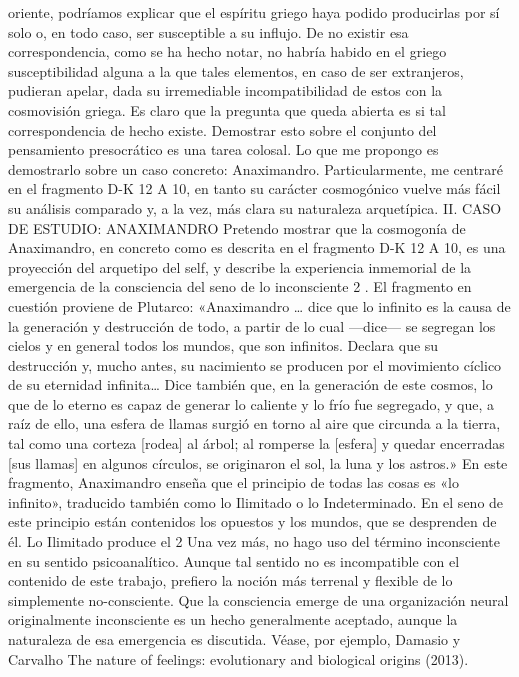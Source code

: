 \documentclass[a4paper]{article}
\begin{document}
oriente, podríamos explicar que el espíritu griego haya podido producirlas por
sí solo o, en todo caso, ser susceptible a su influjo. De no existir esa
correspondencia, como se ha hecho notar, no habría habido en el griego
susceptibilidad alguna a la que tales elementos, en caso de ser extranjeros,
pudieran apelar, dada su irremediable incompatibilidad de estos con la
cosmovisión griega. Es claro que la pregunta que queda abierta es si tal
correspondencia de hecho existe. Demostrar esto sobre el conjunto del
pensamiento presocrático es una tarea colosal. Lo que me propongo es demostrarlo
sobre un caso concreto: Anaximandro. Particularmente, me centraré en el
fragmento D-K 12 A 10, en tanto su carácter cosmogónico vuelve más fácil su
análisis comparado y, a la vez, más clara su naturaleza arquetípica. II. CASO DE
ESTUDIO: ANAXIMANDRO Pretendo mostrar que la cosmogonía de Anaximandro, en
concreto como es descrita en el fragmento D-K 12 A 10, es una proyección del
arquetipo del self, y describe la experiencia inmemorial de la emergencia de la
consciencia del seno de lo inconsciente 2 . El fragmento en cuestión proviene de
Plutarco: «Anaximandro … dice que lo infinito es la causa de la generación y
destrucción de todo, a partir de lo cual —dice— se segregan los cielos y en
general todos los mundos, que son infinitos. Declara que su destrucción y, mucho
antes, su nacimiento se producen por el movimiento cíclico de su eternidad
infinita… Dice también que, en la generación de este cosmos, lo que de lo eterno
es capaz de generar lo caliente y lo frío fue segregado, y que, a raíz de ello,
una esfera de llamas surgió en torno al aire que circunda a la tierra, tal como
una corteza [rodea] al árbol; al romperse la [esfera] y quedar encerradas [sus
llamas] en algunos círculos, se originaron el sol, la luna y los astros.» En
este fragmento, Anaximandro enseña que el principio de todas las cosas es «lo
infinito», traducido también como lo Ilimitado o lo Indeterminado. En el seno de
este principio están contenidos los opuestos y los mundos, que se desprenden de
él. Lo Ilimitado produce el 2 Una vez más, no hago uso del término inconsciente
en su sentido psicoanalítico. Aunque tal sentido no es incompatible con el
contenido de este trabajo, prefiero la noción más terrenal y flexible de lo
simplemente no-consciente. Que la consciencia emerge de una organización neural
originalmente inconsciente es un hecho generalmente aceptado, aunque la
naturaleza de esa emergencia es discutida. Véase, por ejemplo, Damasio y
Carvalho The nature of feelings: evolutionary and biological origins (2013).
\end{document}
